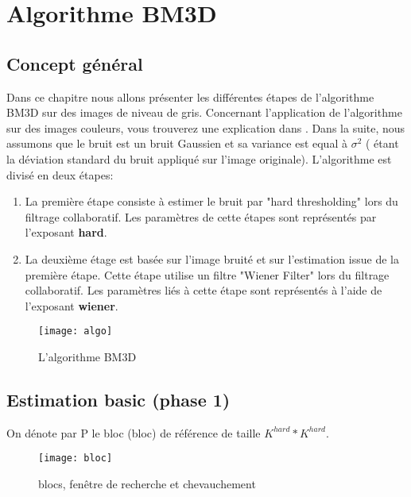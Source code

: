 
\chapter{Algorithme BM3D}
\section{Concept général}
Dans ce chapitre nous allons présenter les différentes étapes de l'algorithme BM3D sur des images de niveau de gris. Concernant l'application de l'algorithme sur des images couleurs, vous trouverez une explication dans \cite{2}. Dans la suite, nous assumons que le bruit est un bruit Gaussien et sa variance est equal à \(\sigma^2\) (\sigma \: étant la déviation standard du bruit appliqué sur l'image originale).
\newline
\newline
L'algorithme est divisé en deux étapes:
\newline
\newline
\begin{enumerate}
\item La première étape consiste à estimer le bruit par "hard thresholding" lors du filtrage collaboratif. Les paramètres de cette étapes sont représentés par l'exposant \textbf{hard}.
\item La deuxième étage est basée sur l'image bruité et sur l'estimation issue de la première étape. Cette étape utilise un filtre "Wiener Filter" lors du filtrage collaboratif. Les paramètres liés à cette étape sont représentés à l'aide de l'exposant \textbf{wiener}.
\end{enumerate}
\newpage
\begin{figure}[h]    
    \texttt{[image: algo]}
    \caption{L'algorithme BM3D}
\end{figure}
\newpage

\section{Estimation basic (phase 1)}
On dénote par P le bloc (bloc) de référence de taille \(K^{hard} * K^{hard}\).
\begin{figure}[h]    
    \centering
    \texttt{[image: bloc]}
    \caption{blocs, fenêtre de recherche et chevauchement}
\end{figure}

